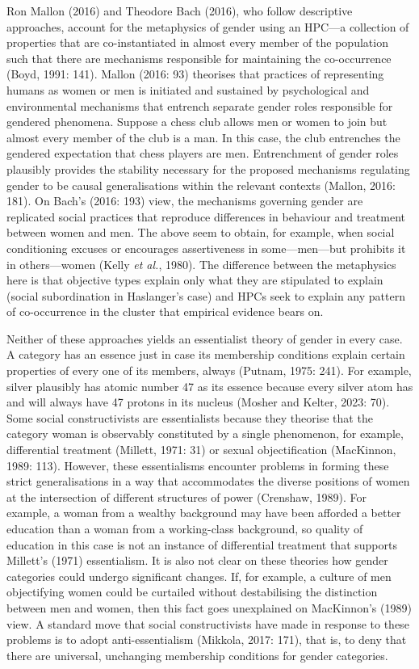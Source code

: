 Ron Mallon (2016) and Theodore Bach (2016), who follow descriptive
approaches, account for the metaphysics of gender using an HPC---a
collection of properties that are co-instantiated in almost every member
of the population such that there are mechanisms responsible for
maintaining the co-occurrence (Boyd, 1991: 141). Mallon (2016: 93)
theorises that practices of representing humans as women or men is
initiated and sustained by psychological and environmental mechanisms
that entrench separate gender roles responsible for gendered phenomena.
Suppose a chess club allows men or women to join but almost every member
of the club is a man. In this case, the club entrenches the gendered
expectation that chess players are men. Entrenchment of gender roles
plausibly provides the stability necessary for the proposed mechanisms
regulating gender to be causal generalisations within the relevant
contexts (Mallon, 2016: 181). On Bach's (2016: 193) view, the mechanisms
governing gender are replicated social practices that reproduce
differences in behaviour and treatment between women and men. The above
seem to obtain, for example, when social conditioning excuses or
encourages assertiveness in some---men---but prohibits it in others---women (Kelly \emph{et al.}, 1980). The difference between the
metaphysics here is that objective types explain only what they are
stipulated to explain (social subordination in Haslanger's case) and
HPCs seek to explain any pattern of co-occurrence in the cluster that
empirical evidence bears on.

Neither of these approaches yields an essentialist theory of gender in
every case. A category has an essence just in case its membership
conditions explain certain properties of every one of its members,
always (Putnam, 1975: 241). For example, silver plausibly has atomic
number 47 as its essence because every silver atom has and will always
have 47 protons in its nucleus (Mosher and Kelter, 2023: 70). Some
social constructivists are essentialists because they theorise that the
category woman is observably constituted by a single phenomenon, for
example, differential treatment (Millett, 1971: 31) or sexual
objectification (MacKinnon, 1989: 113). However, these essentialisms
encounter problems in forming these strict generalisations in a way that
accommodates the diverse positions of women at the intersection of
different structures of power (Crenshaw, 1989). For example, a woman
from a wealthy background may have been afforded a better education than
a woman from a working-class background, so quality of education in this
case is not an instance of differential treatment that supports
Millett's (1971) essentialism. It is also not clear on these theories
how gender categories could undergo significant changes. If, for
example, a culture of men objectifying women could be curtailed without
destabilising the distinction between men and women, then this fact goes
unexplained on MacKinnon's (1989) view. A standard move that social
constructivists have made in response to these problems is to adopt
anti-essentialism (Mikkola, 2017: 171), that is, to deny that there are
universal, unchanging membership conditions for gender categories.

